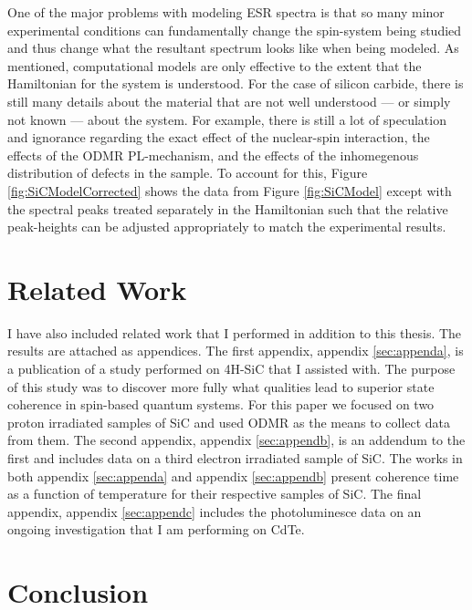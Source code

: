 \documentclass[oneside]{BYUPhys}
\begin{document}
One of the major problems with modeling ESR spectra is that so many minor experimental conditions can fundamentally change the spin-system being studied and thus change what the resultant spectrum looks like when being modeled. As mentioned, computational models are only effective to the extent that the Hamiltonian for the system is understood. For the case of silicon carbide, there is still many details about the material that are not well understood --- or simply not known --- about the system. For example, there is still a lot of speculation and ignorance regarding the exact effect of the nuclear-spin interaction, the effects of the ODMR PL-mechanism, and the effects of the inhomegenous distribution of defects in the sample. To account for this, Figure \ref{fig:SiCModelCorrected} shows the data from Figure \ref{fig:SiCModel} except with the spectral peaks treated separately in the Hamiltonian such that the relative peak-heights can be adjusted appropriately to match the experimental results.

\section{Related Work}

I have also included related work that I performed in addition to this thesis. The results are attached as appendices. The first appendix, appendix \ref{sec:appenda}, is a publication of a study performed on 4H-SiC that I assisted with. The purpose of this study was to discover more fully what qualities lead to superior state coherence in spin-based quantum systems. For this paper we focused on two proton irradiated samples of SiC and used ODMR as the means to collect data from them. The second appendix, appendix \ref{sec:appendb}, is an addendum to the first and includes data on a third electron irradiated sample of SiC. The works in both appendix \ref{sec:appenda} and appendix \ref{sec:appendb} present coherence time as a function of temperature for their respective samples of SiC. The final appendix, appendix \ref{sec:appendc} includes the photoluminesce data on an ongoing investigation that I am performing on CdTe.

\section{Conclusion}
\end{document}
